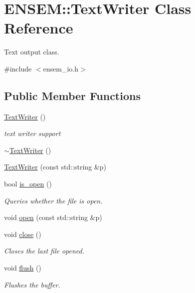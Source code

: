 \hypertarget{classENSEM_1_1TextWriter}{}\section{E\+N\+S\+EM\+:\+:Text\+Writer Class Reference}
\label{classENSEM_1_1TextWriter}


Text output class.  




{\ttfamily \#include $<$ensem\+\_\+io.\+h$>$}

\subsection*{Public Member Functions}
\begin{DoxyCompactItemize}
\item 
\mbox{\hyperlink{classENSEM_1_1TextWriter_ad0b4ad57a3e91011920a473244447cac}{Text\+Writer}} ()
\begin{DoxyCompactList}\small\item\em text writer support \end{DoxyCompactList}\item 
\mbox{\hyperlink{classENSEM_1_1TextWriter_a2aa3ba4260c005b4a2910046448cc193}{$\sim$\+Text\+Writer}} ()
\item 
\mbox{\hyperlink{classENSEM_1_1TextWriter_abbaa16dfaccb062fc8cea4ce2abf3215}{Text\+Writer}} (const std\+::string \&p)
\item 
bool \mbox{\hyperlink{classENSEM_1_1TextWriter_a6718d81018fe6a709f11cdb2f008c68b}{is\+\_\+open}} ()
\begin{DoxyCompactList}\small\item\em Queries whether the file is open. \end{DoxyCompactList}\item 
void \mbox{\hyperlink{classENSEM_1_1TextWriter_a8a7bdd80e930dd002d3af693e5a2cb95}{open}} (const std\+::string \&p)
\item 
void \mbox{\hyperlink{classENSEM_1_1TextWriter_a8b65ccb4936fe8b05492e4f30983b7ee}{close}} ()
\begin{DoxyCompactList}\small\item\em Closes the last file opened. \end{DoxyCompactList}\item 
void \mbox{\hyperlink{classENSEM_1_1TextWriter_a6062726c44aa7c500a065a416ae03a67}{flush}} ()
\begin{DoxyCompactList}\small\item\em Flushes the buffer. \end{DoxyCompactList}\item 

\end{DoxyCompactItemize}
